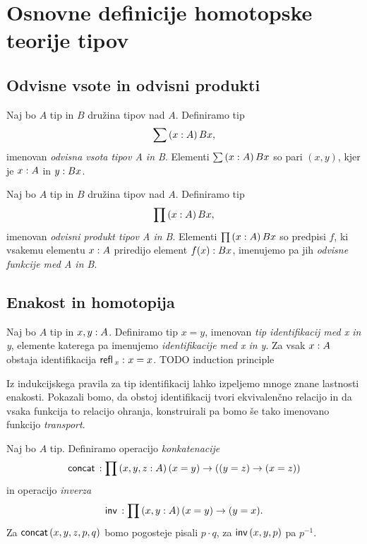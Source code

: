\section{Osnovne definicije homotopske teorije tipov}

\subsection{Odvisne vsote in odvisni produkti}

\begin{definicija}
  Naj bo \(A\) tip in \(B\) družina tipov nad \(A\).
  Definiramo tip \[\sum \left( x : A \right) Bx,\]
  imenovan \emph{odvisna vsota tipov A in B}. Elementi \(\sum \left( x : A \right) Bx\) so pari
  \(\left(x, y\right)\), kjer je \(x : A\) in \(y : Bx\).
\end{definicija}

\begin{definicija}
  Naj bo \(A\) tip in \(B\) družina tipov nad \(A\).
  Definiramo tip \[\prod \left( x : A \right) Bx,\]
  imenovan \emph{odvisni produkt tipov A in B}. Elementi
  \(\prod \left( x : A \right) Bx\) so predpisi \(f\), ki vsakemu elementu \(x : A\)
  priredijo element \(f(x) : Bx\), imenujemo pa jih
  \emph{odvisne funkcije med A in B}.
\end{definicija}


\subsection{Enakost in homotopija}

\begin{definicija}
  Naj bo \(A\) tip in \(x, y : A\). Definiramo tip \(x = y\), imenovan
  \emph{tip identifikacij med x in y}, elemente katerega pa imenujemo
  \emph{identifikacije med x in y}. Za vsak \(x : A\) obstaja identifikacija
  \(\textnormal{\textsf{refl}}\,_{x} \,\colon x = x\). TODO induction principle
\end{definicija}

Iz indukcijskega pravila za tip identifikacij lahko izpeljemo mnoge znane lastnosti
enakosti. Pokazali bomo, da obstoj identifikacij tvori ekvivalenčno relacijo in da vsaka
funkcija to relacijo ohranja,
konstruirali pa bomo še tako imenovano funkcijo \emph{transport}.

\begin{definicija}
  Naj bo \(A\) tip. Definiramo operacijo \emph{konkatenacije}
  \[\textnormal{\textsf{concat}}\, : \prod \left( x, y, z : A \right) (x = y) \to ((y = z) \to (x = z))\]
  in operacijo \emph{inverza}
  \[\textnormal{\textsf{inv}}\, : \prod \left( x, y : A \right) (x = y) \to (y = x).\]
  Za \(\textnormal{\textsf{concat}}\,(x, y, z, p, q)\) bomo pogosteje pisali \(p \cdot q\), za
  \(\textnormal{\textsf{inv}}\,(x, y, p)\) pa \(p^{-1}\).
\end{definicija}

